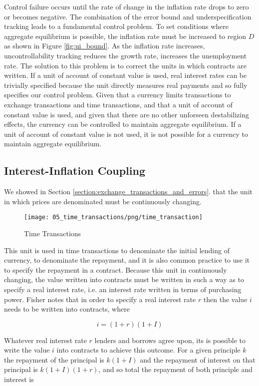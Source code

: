 Control failure occurs until the rate of change in the inflation rate drops to zero or becomes
negative. The combination of the error bound and underspecification tracking leads to a fundamental
control problem. To set conditions where aggregate equilibrium is possible, the inflation rate must
be increased to region $D$ as shown in Figure \ref{fig:ui_bound}. As the inflation rate increases,
uncontrollability tracking reduces the growth rate, increases the unemployment rate. The solution to
this problem is to correct the units in which contracts are written. If a unit of account of
constant value is used, real interest rates can be trivially specified because the unit directly
measures real payments and so fully specifies our control problem. Given that a currency limits
transactions to exchange transactions and time transactions, and that a unit of account of constant
value is used, and given that there are no other unforseen destabilizing effects, the currency can
be controlled to maintain aggregate equilibrium. If a unit of account of constant value is not used,
it is not possible for a currency to maintain aggregate equilibrium.

\subsection{Interest-Inflation Coupling}

We showed in Section \ref{section:exchange_transactions_and_errors}. that the unit in which prices are
denominated must be continuously changing.

\begin{figure}[H]
\centering
\texttt{[image: 05\_time\_transactions/png/time\_transaction]}
\caption{Time Transactions}
\label{fig:time_transaction_contracts}
\end{figure}

This unit is used in time transactions to denominate the initial lending of currency, to denominate
the repayment, and it is also common practice to use it to specify the repayment in a contract.
Because this unit in continuously changing, the value written into contracts must be written in such
a way as to specify a real interest rate, i.e. an interest rate written in terms of purchasing
power. Fisher \cite{fisher1907} notes that in order to specify a real interest rate $r$ then the
value $i$ needs to be written into contracts, where

\[
    i = (1+r)(1+I)
\]

Whatever real interest rate $r$ lenders and borrows agree upon, its is possible to write the value
$i$ into contracts to achieve this outcome. For a given principle $k$ the repayment of the principal
is $k(1+I)$ and the repayment of interest on that principal is $k(1+I)(1+r)$, and so total the
repayment of both principle and interest is

